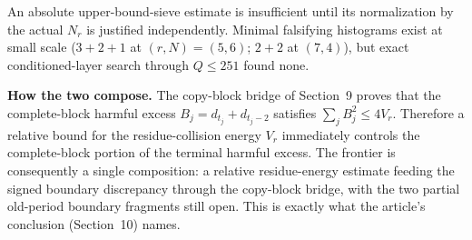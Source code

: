 An absolute upper-bound-sieve estimate is insufficient until its
normalization by the actual $N_r$ is justified independently. Minimal
falsifying histograms exist at small scale ($3+2+1$ at $(r,N)=(5,6)$;
$2+2$ at $(7,4)$), but exact conditioned-layer search through $Q\le251$
found none. 

\textbf{How the two compose.} The copy-block bridge of Section~9 proves that the
complete-block harmful excess $B_j=d_{t_j}+d_{t_j-2}$ satisfies
$\sum_jB_j^2\le4V_r$. Therefore a relative bound for the residue-collision
energy $V_r$ immediately controls the complete-block portion of the terminal
harmful excess. The frontier is consequently a single composition: a relative
residue-energy estimate feeding the signed boundary discrepancy through the
copy-block bridge, with the two partial old-period boundary fragments still
open. This is exactly what the article's conclusion (Section~10) names.
